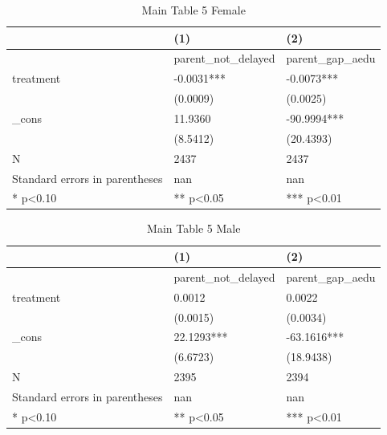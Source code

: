 \documentclass[11pt]{article}
\begin{document}
\clearpage
\begin{table}[!htbp]
\centering
\caption{Main Table 5 Female}
\label{tab:table5_f}
\begin{tabular}{lll}
\toprule
 & (1) & (2) \\
\midrule
 & parent\_not\_delayed & parent\_gap\_aedu \\
treatment & -0.0031*** & -0.0073*** \\
 & (0.0009) & (0.0025) \\
\_cons & 11.9360 & -90.9994*** \\
 & (8.5412) & (20.4393) \\
N & 2437 & 2437 \\
Standard errors in parentheses & nan & nan \\
* p<0.10 & ** p<0.05 & *** p<0.01 \\
\bottomrule
\end{tabular}

\end{table}

\clearpage
\begin{table}[!htbp]
\centering
\caption{Main Table 5 Male}
\label{tab:table5_m}
\begin{tabular}{lll}
\toprule
 & (1) & (2) \\
\midrule
 & parent\_not\_delayed & parent\_gap\_aedu \\
treatment & 0.0012 & 0.0022 \\
 & (0.0015) & (0.0034) \\
\_cons & 22.1293*** & -63.1616*** \\
 & (6.6723) & (18.9438) \\
N & 2395 & 2394 \\
Standard errors in parentheses & nan & nan \\
* p<0.10 & ** p<0.05 & *** p<0.01 \\
\bottomrule
\end{tabular}

\end{table}
\end{document}
